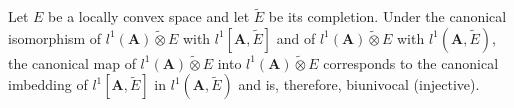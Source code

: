 Let $E$ be a locally convex space and let $\tilde{E}$ be its completion. Under the canonical isomorphism of $l^1(\mathbf{A}) \mathbin{\tilde{\otimes}} E$ with $l^1[\mathbf{A}, \tilde{E}]$ and of $l^1(\mathbf{A}) \mathbin{\tilde{\otimes}} E$ with $l^1(\mathbf{A}, \tilde{E})$, the canonical map of $l^1(\mathbf{A}) \mathbin{\tilde{\otimes}} E$ into $l^1(\mathbf{A}) \mathbin{\tilde{\otimes}} E$ corresponds to the canonical imbedding of $l^1[\mathbf{A}, \tilde{E}]$ in $l^1(\mathbf{A}, \tilde{E})$ and is, therefore, biunivocal (injective).
